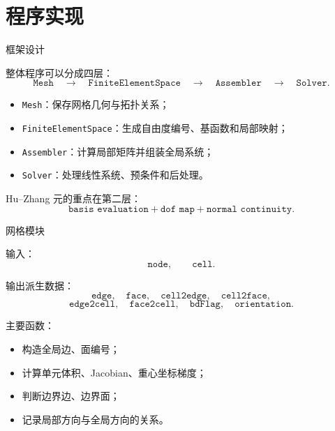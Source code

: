 \documentclass[aspectratio=169,professionalfonts]{ctexbeamer}
\begin{document}
\section{程序实现}
\begin{frame}{框架设计}

整体程序可以分成四层：
$$
\texttt{Mesh}
\quad\longrightarrow\quad
\texttt{FiniteElementSpace}
\quad\longrightarrow\quad
\texttt{Assembler}
\quad\longrightarrow\quad
\texttt{Solver}.
$$

\vspace{0.5em}

\begin{itemize}
  \item \texttt{Mesh}：保存网格几何与拓扑关系；
  \item \texttt{FiniteElementSpace}：生成自由度编号、基函数和局部映射；
  \item \texttt{Assembler}：计算局部矩阵并组装全局系统；
  \item \texttt{Solver}：处理线性系统、预条件和后处理。
\end{itemize}

\vspace{0.5em}

Hu--Zhang 元的重点在第二层：
$$
\texttt{basis evaluation}
+
\texttt{dof map}
+
\texttt{normal continuity}.
$$

\end{frame}

\begin{frame}{网格模块}

输入：
$$
\texttt{node},
\qquad
\texttt{cell}.
$$

输出派生数据：
$$
\texttt{edge},\quad
\texttt{face},\quad
\texttt{cell2edge},\quad
\texttt{cell2face},
$$
$$
\texttt{edge2cell},\quad
\texttt{face2cell},\quad
\texttt{bdFlag},\quad
\texttt{orientation}.
$$

\vspace{0.4em}

主要函数：
\begin{itemize}
  \item 构造全局边、面编号；
  \item 计算单元体积、Jacobian、重心坐标梯度；
  \item 判断边界边、边界面；
  \item 记录局部方向与全局方向的关系。
\end{itemize}

\end{frame}
\end{document}
